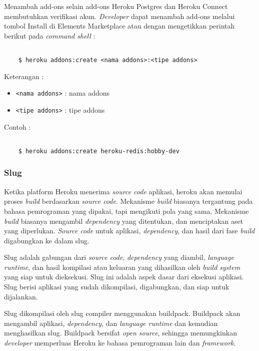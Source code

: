 Menambah add-ons selain add-ons Heroku Postgres dan Heroku Connect membutuhkan verifikasi akun. \textit{Developer} dapat menambah add-ons melalui tombol Install di Elements Marketplace atau dengan mengetikkan perintah berikut pada \textit{command shell} :
\begin{lstlisting}

	$ heroku addons:create <nama addons>:<tipe addons>

\end{lstlisting}
Keterangan :
\begin{itemize}
\item \texttt{<nama addons>} : nama addons
\item \texttt{<tipe addons>} : tipe addons
\end{itemize}

Contoh :
\begin{lstlisting}

	$ heroku addons:create heroku-redis:hobby-dev

\end{lstlisting}

\subsubsection{Slug}
Ketika platform Heroku menerima \textit{source code} aplikasi, heroku akan memulai proses \textit{build} berdasarkan \textit{source code}. Mekanisme \textit{build} biasanya tergantung pada bahasa pemrograman yang dipakai, tapi mengikuti pola yang sama. Mekanisme \textit{build} biasanya mengambil \textit{dependency} yang ditentukan, dan menciptakan aset yang diperlukan. \textit{Source code} untuk aplikasi, \textit{dependency}, dan hasil dari fase \textit{build} digabungkan ke dalam slug. 

Slug adalah gabungan dari \textit{source code}, \textit{dependency} yang diambil, \textit{language runtime}, dan hasil kompilasi atau keluaran yang dihasilkan oleh \textit{build system} yang siap untuk dieksekusi. Slug ini adalah aspek dasar dari eksekusi aplikasi. Slug berisi aplikasi yang sudah dikompilasi, digabungkan, dan siap untuk dijalankan.

Slug dikompilasi oleh slug compiler menggunakan buildpack. Buildpack akan mengambil aplikasi, \textit{dependency}, dan \textit{language runtime} dan kemudian menghasilkan slug. Buildpack bersifat \textit{open source}, sehingga memungkinkan \textit{developer} memperluas Heroku ke bahasa pemrograman lain dan \textit{framework}.

